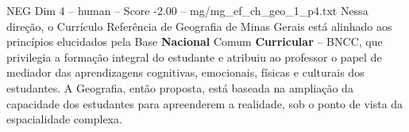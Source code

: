 \begin{textsample}{NEG Dim 4 – human – Score -2.00 – mg/mg\_ef\_ch\_geo\_1\_p4.txt}  \label{ex:f4_neg_014}
Nessa direção, o Currículo Referência de Geografia de Minas Gerais está alinhado aos princípios elucidados pela Base \textbf{Nacional} Comum \textbf{Curricular} – BNCC, que privilegia a formação integral do estudante e atribuiu ao professor o papel de mediador das aprendizagens cognitivas, emocionais, físicas e culturais dos estudantes.
A Geografia, então proposta, está baseada na ampliação da capacidade dos estudantes para apreenderem a realidade, sob o ponto de vista da espacialidade complexa.

\end{textsample}
